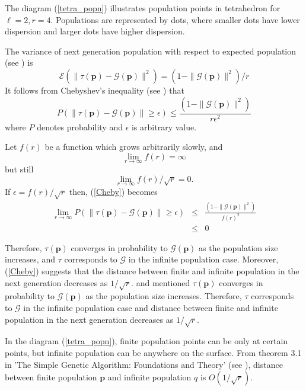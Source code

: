 The diagram (\ref{tetra_popn}) illustrates population points in tetrahedron for $\ell  =  2,  r  =  4$. Populations are represented by dots, 
where smaller dots have lower dispersion and larger dots have higher dispersion.

The variance of next generation population with respect to expected population (see \cite{Vose1999}) is 
\begin{equation}
\label{RHSvariance}
\mathcal{E}(\| \tau (\bm{p}) - \mathcal{G}(\bm{p}) \|^2) = (1 - \|\mathcal{G}(\bm{p})\|^2) / r
\end{equation}
It follows from Chebyshev's inequality (see \cite{ChebyshevInequality}) that 
\begin{equation}
\label{Cheby}
P(\| \tau (\bm{p}) - \mathcal{G}(\bm{p}) \| \geq \epsilon) \leq \frac{(1 - \|\mathcal{G}(\bm{p})\|^2)} {r{\epsilon}^2}
\end{equation}
where $P$ denotes probability and $\epsilon$ is arbitrary value.

Let $f(r)$ be a function which grows arbitrarily slowly, and 
\[
\lim_{r \to \infty} f(r)  =  \infty
\]
but still
\[
\lim_{r \to \infty} f(r)/\sqrt{r}  =  0.
\]
If $\epsilon  =  f(r)/\sqrt{r}$ then, (\ref{Cheby}) becomes
\begin{eqnarray*}
\lim_{r \to \infty} P(\| \tau (\bm{p}) - \mathcal{G}(\bm{p}) \| \geq \epsilon) & \leq & \frac{(1 - \|\mathcal{G}(\bm{p})\|^2)} {{f(r)}^2} \\
    & \leq & 0
\end{eqnarray*}

Therefore, $\tau(\bm{p})$ converges in probability to $\mathcal{G}(\bm{p})$ as the population size increases, 
and $\tau$ corresponds to $\mathcal{G}$ 
in the infinite population case. Moreover, (\ref{Cheby}) suggests that the distance between finite and 
infinite population in the next generation decreases as $1/\sqrt{r}$.
and mentioned $\tau (\bm{p})$ converges in probability to $\mathcal{G}(\bm{p})$ as the population size increases. 
Therefore, $\tau$ corresponds to $\mathcal{G}$ in the infinite
population case and distance between finite and infinite population in the next generation decreases as $1/\sqrt{r}$.

In the diagram (\ref{tetra_popn}), finite population points can be only at certain points, but infinite population can be anywhere on the surface. 
From theorem 3.1 in 'The Simple Genetic Algorithm: Foundations and Theory' (see \cite{Vose1999}), distance between finite population $\bm{p}$ 
and infinite population $q$ is $O(1/\sqrt{r})$. 

